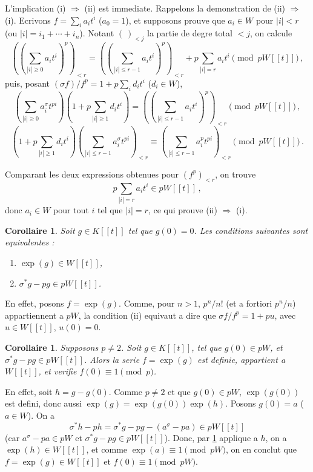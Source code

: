 \documentclass[12pt,a4paper]{article}
\theoremstyle{plain}
\newtheorem{corollary}[theorem]{Corollaire}
\theoremstyle{definition}
\theoremstyle{remark}
\begin{document}
L'implication (i) $\Rightarrow$ (ii) est immediate. Rappelons la demonstration de (ii) $\Rightarrow$ (i). Ecrivons $f = \sum_i a_it^i$ ($a_0 = 1$), et supposons prouve que $a_i \in W$ pour $|i| < r$ (ou $|i| = i_1 + \cdots + i_n$). Notant $(\ )_{<j}$ la partie de degre total $< j$, on calcule
\[
((\sum_{|i| \geq 0} a_it^i)^p)_{<r} = ((\sum_{|i| \leq r-1} a_it^i)^p)_{<r} + p\sum_{|i|=r} a_it^i \pmod{pW[[t]]}\,,
\]
puis, posant $(\sigma f)/f^p = 1 + p\sum_i d_it^i$ ($d_i \in W$),
\[
(\sum_{|i| \geq 0} a_i^\sigma t^{pi})(1 + p\sum_{|i| \geq 1} d_it^i) = ((\sum_{|i| \leq r-1} a_it^i)^p)_{<r} \pmod{pW[[t]]}\,,
\]
\[
(1 + p\sum_{|i| \geq 1} d_it^i)(\sum_{|i| \leq r-1} a_i^\sigma t^{pi})_{<r} \equiv (\sum_{|i| \leq r-1} a_i^pt^{pi})_{<r} \pmod{pW[[t]]}\,.\]

Comparant les deux expressions obtenues pour $(f^p)_{<r}$, on trouve
\[
p\sum_{|i|=r} a_it^i \in pW[[t]]\,,
\]
donc $a_i \in W$ pour tout $i$ tel que $|i| = r$, ce qui prouve (ii) $\Rightarrow$ (i).

\begin{corollary}\label{cor:1.4.4}
Soit $g \in K[[t]]$ tel que $g(0) = 0$. Les conditions suivantes sont equivalentes :
\begin{enumerate}[label=(\roman*)]
\item $\exp(g) \in W[[t]]$,
\item $\sigma^*g - pg \in pW[[t]]$.
\end{enumerate}
\end{corollary}

En effet, posons $f = \exp(g)$. Comme, pour $n > 1$, $p^n/n!$ (et a fortiori $p^n/n$) appartiennent a $pW$, la condition (ii) equivaut a dire que $\sigma f/f^p = 1 + pu$, avec $u \in W[[t]]$, $u(0) = 0$.

\begin{corollary}\label{cor:1.4.5}
Supposons $p \neq 2$. Soit $g \in K[[t]]$, tel que $g(0) \in pW$, et $\sigma^*g - pg \in pW[[t]]$. Alors la serie $f = \exp(g)$ est definie, appartient a $W[[t]]$, et verifie $f(0) \equiv 1 \pmod{p}$.
\end{corollary}

En effet, soit $h = g - g(0)$. Comme $p \neq 2$ et que $g(0) \in pW$, $\exp(g(0))$ est defini, donc aussi $\exp(g) = \exp(g(0))\exp(h)$. Posons $g(0) = a$ ($a \in W$). On a
\[
\sigma^*h - ph = \sigma^*g - pg - (a^\sigma - pa) \in pW[[t]]
\]
(car $a^\sigma - pa \in pW$ et $\sigma^*g - pg \in pW[[t]]$). Donc, par \ref{cor:1.4.4} applique a $h$, on a $\exp(h) \in W[[t]]$, et comme $\exp(a) \equiv 1 \pmod{pW}$, on en conclut que $f = \exp(g) \in W[[t]]$ et $f(0) \equiv 1 \pmod{pW}$.
\end{document}
